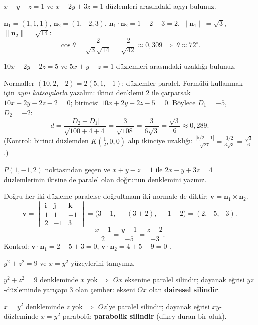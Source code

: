 \begin{soru}
$x+y+z=1$ ve $x-2y+3z=1$ düzlemleri arasındaki açıyı bulunuz.
\end{soru}
\begin{cevap}
$\mathbf n_1=(1,1,1)$, $\mathbf n_2=(1,-2,3)$, $\mathbf n_1\cdot\mathbf n_2=1-2+3=2$, $\|\mathbf n_1\|=\sqrt3$, $\|\mathbf n_2\|=\sqrt{14}$:
\[ \cos\theta=\frac{2}{\sqrt3\sqrt{14}}=\frac{2}{\sqrt{42}}\approx0{,}309\ \Rightarrow\ \theta\approx72^\circ . \]
\end{cevap}

\begin{soru}
$10x+2y-2z=5$ ve $5x+y-z=1$ düzlemleri arasındaki uzaklığı bulunuz.
\end{soru}
\begin{cevap}
Normaller $(10,2,-2)=2(5,1,-1)$; düzlemler paralel. Formülü kullanmak için \emph{aynı katsayılarla} yazalım: ikinci denklemi $2$ ile çarparsak $10x+2y-2z-2=0$; birincisi $10x+2y-2z-5=0$. Böylece $D_1=-5$, $D_2=-2$:
\[ d=\frac{|D_2-D_1|}{\sqrt{100+4+4}}=\frac{3}{\sqrt{108}}=\frac{3}{6\sqrt3}=\frac{\sqrt3}{6}\approx0{,}289 . \]
(Kontrol: birinci düzlemden $K(\frac12,0,0)$ alıp ikinciye uzaklığı: $\frac{|5/2-1|}{\sqrt{27}}=\frac{3/2}{3\sqrt3}=\frac{\sqrt3}{6}$ \checkmark.)
\end{cevap}

\begin{soru}
$P(1,-1,2)$ noktasından geçen ve $x+y-z=1$ ile $2x-y+3z=4$ düzlemlerinin ikisine de paralel olan doğrunun denklemini yazınız.
\end{soru}
\begin{cevap}
Doğru her iki düzleme paralelse doğrultmanı iki normale de diktir: $\mathbf v=\mathbf n_1\times\mathbf n_2$.
\[ \mathbf v=\begin{vmatrix}\mathbf i&\mathbf j&\mathbf k\\1&1&-1\\2&-1&3\end{vmatrix}=\big(3-1,\ -(3+2),\ -1-2\big)=(2,-5,-3). \]
\[ \frac{x-1}{2}=\frac{y+1}{-5}=\frac{z-2}{-3}. \]
Kontrol: $\mathbf v\cdot\mathbf n_1=2-5+3=0$, $\mathbf v\cdot\mathbf n_2=4+5-9=0$ \checkmark.
\end{cevap}

\begin{soru}
$y^2+z^2=9$ ve $x=y^2$ yüzeylerini tanıyınız.
\end{soru}
\begin{cevap}
$y^2+z^2=9$ denkleminde $x$ yok $\Rightarrow$ $Ox$ eksenine paralel silindir; dayanak eğrisi $yz$-düzleminde yarıçapı $3$ olan çember: ekseni $Ox$ olan \textbf{dairesel silindir}.

$x=y^2$ denkleminde $z$ yok $\Rightarrow$ $Oz$'ye paralel silindir; dayanak eğrisi $xy$-düzleminde $x=y^2$ parabolü: \textbf{parabolik silindir} (dikey duran bir oluk).
\end{cevap}

